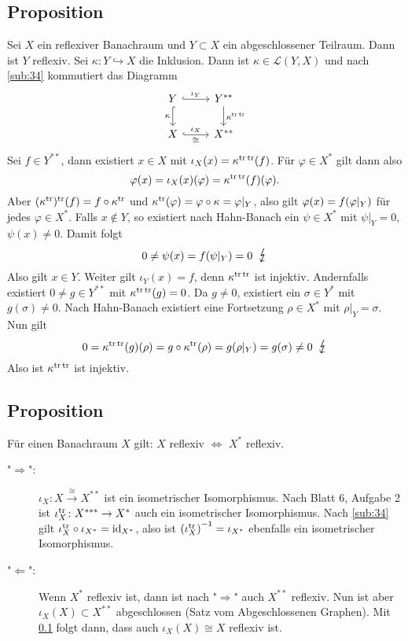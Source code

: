 \subsection[Proposition: Abgeschlossene Unterräume von reflexiven Banachräumen sind reflexiv]{Proposition} %
\label{sub:514}
Sei $X$ ein reflexiver Banachraum und $Y \subset X$ ein abgeschlossener Teilraum. Dann ist $Y$ reflexiv.
Sei $\kappa \colon Y \hookrightarrow X$ die Inklusion. Dann ist $\kappa \in \mathcal{L}(Y,X)$ und nach \ref{sub:34} kommutiert das Diagramm
\[
	\begin{tikzcd}
		Y \rar[hook, "\iota_Y"] \dar["\kappa"', hook]& Y^{**}  \dar["\kappa^{\tr \,\tr}"] \\
		X \rar["\iota_X","\cong"', hook] & X^{**}
	\end{tikzcd}
\]
Sei $f\in Y^{**}$, dann existiert $x \in X$ mit $\iota_X(x)=\kappa^{\tr\,\tr}(f)$. Für $\varphi \in X^*$ gilt dann also
\[
	\varphi(x)=\iota_X(x)(\varphi)=\kappa^{\tr\,\tr}(f)(\varphi).
\]
Aber $(\kappa^\tr)^\tr (f) = f \circ \kappa^\tr$ und $\kappa^\tr(\varphi) = \varphi \circ \kappa = \varphi|_{Y}$, also gilt $\varphi(x)= f \enbrace*{\varphi|_Y}$ für jedes 
$\varphi \in X^*$. Falls $x \not\in Y$, so existiert nach Hahn-Banach ein $\psi \in X^*$ mit $\psi|_{Y}=0$, $\psi(x)\not= 0$. Damit folgt 
\[
	0 \not= \psi(x) = f \enbrace*{\psi|_{Y}}=0 \enspace\light
\]
Also gilt $x \in Y$. Weiter gilt $\iota_Y(x)=f$, denn $\kappa^{\tr\,\tr}$ ist injektiv. Andernfalls existiert $0 \not= g \in Y^{**}$ mit $\kappa^{\tr\,\tr}(g)=0$. 
Da $g\not= 0$, existiert ein $\sigma \in Y^*$ mit $g(\sigma) \not= 0$. Nach Hahn-Banach existiert eine Fortsetzung $\rho \in X^*$ mit $\rho|_{Y}=\sigma$. Nun gilt 
\[
	0 = \kappa^{\tr\,\tr}(g)(\rho) = g \circ \kappa^\tr(\rho)= g \enbrace*{\rho|_Y} = g(\sigma) \not= 0 \enspace \light 
\]
Also ist $\kappa^{\tr\,\tr}$ ist injektiv. \bewende

\subsection[Proposition: Für Banachräume gilt: $X$ reflexiv $\iff$ $X^*$ reflexiv]{Proposition} %
\label{sub:515}
Für einen Banachraum $X$ gilt: $X$ reflexiv $\iff$ $X^*$ reflexiv.
\begin{description}
	\item["$\Rightarrow$":] $\iota_X\colon X\xrightarrow{\cong} X^{**}$ ist ein isometrischer Isomorphismus. Nach Blatt 6, Aufgabe 2 ist $\iota_X^{\tr}\colon X^{***}\to X^*$
	auch ein isometrischer Isomorphismus. Nach \ref{sub:34} gilt  $\iota_X^{\tr} \circ \iota_{X^*}= \id_{X^{*}}$, also ist $\enbrace*{\iota_X^\tr}^{-1} = \iota_{X^*}$
	ebenfalls ein isometrischer Isomorphismus.
	\item["$\Leftarrow$":] Wenn $X^*$ reflexiv ist, dann ist nach "$\Rightarrow$" auch $X^{**}$ reflexiv. Nun ist aber $\iota_X(X) \subset X^{**}$ abgeschlossen (Satz vom 
	Abgeschlossenen Graphen). Mit \ref{sub:514} folgt dann, dass auch $\iota_X(X) \cong X$ reflexiv ist.\bewende
\end{description}

